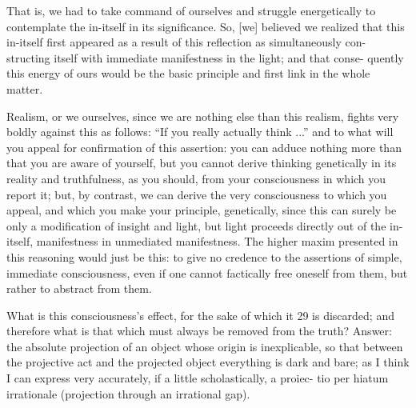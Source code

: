 That is, we had to take command of ourselves and struggle energetically to
contemplate the in-itself in its significance.
So, [we] believed we realized that
this in-itself first appeared as a result of this reflection as simultaneously con-
structing itself with immediate manifestness in the light; and that conse-
quently this energy of ours would be the basic principle and first link in the
whole matter.

Realism, or we ourselves, since we are nothing else than this realism,
fights very boldly against this as follows:
“If you really actually think ...”
and to what will you appeal for confirmation of this assertion:
you can adduce nothing more than that you are aware of yourself,
but you cannot derive thinking genetically in its reality and truthfulness,
as you should, from your consciousness in which you report it;
but, by contrast, we can derive the very consciousness to which you appeal,
and which you make your principle, genetically,
since this can surely be only a modification of insight and light,
but light proceeds directly out of the in-itself,
manifestness in unmediated manifestness.
The higher maxim presented in this reasoning would just be this:
to give no credence to the assertions
of simple, immediate consciousness,
even if one cannot factically free oneself from them,
but rather to abstract from them.

What is this consciousness’s effect, for the sake of which it 29 is discarded; and
therefore what is that which must always be removed from the truth? Answer:
the absolute projection of an object whose origin is inexplicable, so that
between the projective act and the projected object everything is dark and
bare; as I think I can express very accurately, if a little scholastically, a proiec-
tio per hiatum irrationale (projection through an irrational gap).

